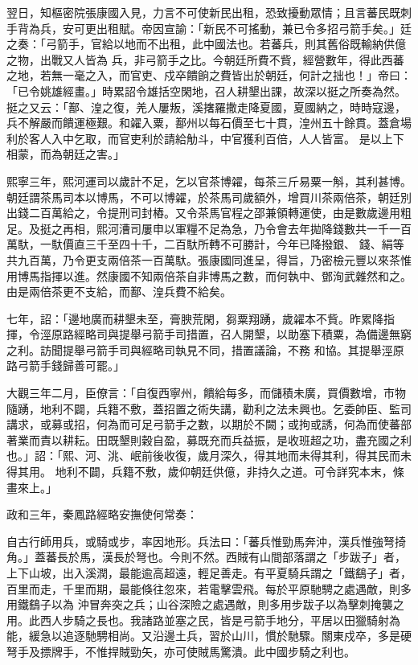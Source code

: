 \begin{pinyinscope}
 翌日，知樞密院張康國入見，力言不可使新民出租，恐致擾動眾情；且言蕃民既刺手背為兵，安可更出租賦。帝因宣諭：「新民不可搖動，兼已令多招弓箭手矣。」廷之奏：「弓箭手，官給以地而不出租，此中國法也。若蕃兵，則其舊俗既輸納供億之物，出戰又人皆為
 兵，非弓箭手之比。今朝廷所費不貲，經營數年，得此西蕃之地，若無一毫之入，而官吏、戍卒饋餉之費皆出於朝廷，何計之拙也！」帝曰：「已令姚雄經畫。」時累詔令雄括空閑地，召人耕墾出課，故深以挺之所奏為然。挺之又云：「鄯、湟之復，羌人屢叛，溪撦羅撒走降夏國，夏國納之，時時寇邊，兵不解嚴而饋運極艱。和糴入粟，鄯州以每石價至七十貫，湟州五十餘貫。蓋倉場利於客人入中乞取，而官吏利於請給觔斗，中官獲利百倍，人人皆富。
 是以上下相蒙，而為朝廷之害。」



 熙寧三年，熙河運司以歲計不足，乞以官茶博糴，每茶三斤易粟一斛，其利甚博。朝廷謂茶馬司本以博馬，不可以博糴，於茶馬司歲額外，增買川茶兩倍茶，朝廷別出錢二百萬給之，令提刑司封樁。又令茶馬官程之邵兼領轉運使，由是數歲邊用粗足。及挺之再相，熙河漕司屢申以軍糧不足為急，乃令會去年拋降錢數共一千一百萬馱，一馱價直三千至四十千，二百馱所轉不可勝計，今年已降撥銀、
 錢、絹等共九百萬，乃令更支兩倍茶一百萬馱。張康國同進呈，得旨，乃密檢元豐以來茶惟用博馬指揮以進。然康國不知兩倍茶自非博馬之數，而何執中、鄧洵武雜然和之。由是兩倍茶更不支給，而鄯、湟兵費不給矣。



 七年，詔：「邊地廣而耕墾未至，膏腴荒閑，芻粟翔踴，歲糴本不貲。昨累降指揮，令涇原路經略司與提舉弓箭手司措置，召人開墾，以助塞下積粟，為備邊無窮之利。訪聞提舉弓箭手司與經略司執見不同，措置議論，不務
 和協。其提舉涇原路弓箭手錢歸善可罷。」



 大觀三年二月，臣僚言：「自復西寧州，饋給每多，而儲積未廣，買價數增，市物隨踴，地利不闢，兵籍不敷，蓋招置之術失講，勸利之法未興也。乞委帥臣、監司講求，或募或招，何為而可足弓箭手之數，以期於不闕；或拘或誘，何為而使蕃部著業而責以耕耘。田既墾則穀自盈，募既充而兵益振，是收班超之功，盡充國之利也。」詔：「熙、河、洮、岷前後收復，歲月深久，得其地而未得其利，得其民而未得其用。
 地利不闢，兵籍不敷，歲仰朝廷供億，非持久之道。可令詳究本末，條畫來上。」



 政和三年，秦鳳路經略安撫使何常奏：



 自古行師用兵，或騎或步，率因地形。兵法曰：「蕃兵惟勁馬奔沖，漢兵惟強弩掎角。」蓋蕃長於馬，漢長於弩也。今則不然。西賊有山間部落謂之「步跋子」者，上下山坡，出入溪潤，最能逾高超遠，輕足善走。有平夏騎兵謂之「鐵鷂子」者，百里而走，千里而期，最能倏往忽來，若電擊雲飛。每於平原馳騁之處遇敵，則多用鐵鷂子以為
 沖冒奔突之兵；山谷深險之處遇敵，則多用步跋子以為擊刺掩襲之用。此西人步騎之長也。我諸路並塞之民，皆是弓箭手地分，平居以田獵騎射為能，緩急以追逐馳騁相尚。又沿邊土兵，習於山川，慣於馳驟。關東戍卒，多是硬弩手及摽牌手，不惟捍賊勁矢，亦可使賊馬驚潰。此中國步騎之利也。




\end{pinyinscope}
